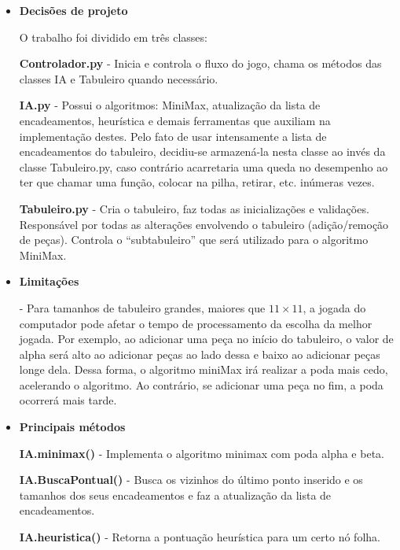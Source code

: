 \documentclass[a4paper,12pt]{article}
\begin{document}
\begin{itemize}
  \item \textbf{Decisões de projeto}
  
  O trabalho foi dividido em três classes:
  
  \textbf{Controlador.py} - Inicia e controla o fluxo do jogo, chama os métodos das classes IA e Tabuleiro quando necessário.
  
  \textbf{IA.py} - Possui o algoritmos: MiniMax, atualização da lista de encadeamentos, heurística e demais ferramentas que auxiliam na
  implementação destes. Pelo fato de usar intensamente a lista de encadeamentos do tabuleiro, decidiu-se armazená-la nesta classe ao invés da classe 
  Tabuleiro.py, caso contrário acarretaria uma queda no desempenho ao ter que chamar uma função, colocar na pilha, retirar, etc. inúmeras vezes.
  
  \textbf{Tabuleiro.py} - Cria o tabuleiro, faz todas as inicializações e validações. Responsável por todas as alterações
  envolvendo o tabuleiro (adição/remoção de peças). Controla o ``subtabuleiro'' que será utilizado para o algoritmo MiniMax. 
 
\end{itemize}

\begin{itemize}
  \item \textbf{Limitações}
  
  - Para tamanhos de tabuleiro grandes, maiores que $11\times11$, a jogada do computador pode afetar o tempo
  de processamento da escolha da melhor jogada. Por exemplo, ao adicionar uma peça no início do tabuleiro, o valor de
  alpha será alto ao adicionar peças ao lado dessa e baixo ao adicionar peças longe dela. Dessa forma, o algoritmo
  miniMax irá realizar a poda mais cedo, acelerando o algoritmo. Ao contrário, se adicionar uma peça no fim, a poda ocorrerá mais tarde.
  
\end{itemize}

\begin{itemize}
  \item \textbf{Principais métodos}
  
  \textbf{IA.minimax()} - Implementa o algoritmo minimax com poda alpha e beta.
  
  \textbf{IA.BuscaPontual()} - Busca os vizinhos do último ponto inserido e os tamanhos dos seus encadeamentos 
  e faz a atualização da lista de encadeamentos.  
  
  \textbf{IA.heuristica()} - Retorna a pontuação heurística para um certo nó folha.
\end{itemize}
\end{document}

